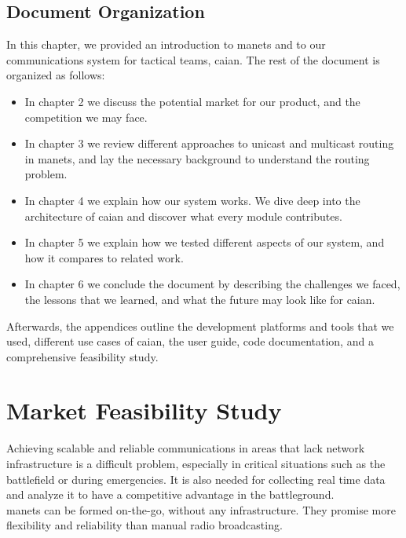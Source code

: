 \section{Document Organization}
In this chapter, we provided an introduction to \acrshort{manets} and to our communications system for tactical teams, \acrshort{caian}. The rest of the document is organized as follows:
\begin{itemize}[itemsep=1pt, topsep=5pt]
    \item In chapter 2 we discuss the potential market for our product, and the competition we may face.
    \item In chapter 3 we review different approaches to unicast and multicast routing in \acrshort{manets}, and lay the necessary background to understand the routing problem. 
    \item In chapter 4 we explain how our system works. We dive deep into the architecture of \acrshort{caian} and discover what every module contributes.
    \item In chapter 5 we explain how we tested different aspects of our system, and how it compares to related work.
    \item In chapter 6 we conclude the document by describing the challenges we faced, the lessons that we learned, and what the future may look like for \acrshort{caian}.
\end{itemize}

Afterwards, the appendices outline the development platforms and tools that we used, different use cases of \acrshort{caian}, the user guide, code documentation, and a comprehensive feasibility study.

\chapter{Market Feasibility Study}
\label{ch:feasability}
Achieving scalable and reliable communications in areas that lack network infrastructure is a difficult problem, especially in critical situations such as the battlefield or during emergencies. It is also needed for collecting real time data and analyze it to have a competitive advantage in the battleground.
\\
\acrfull{manets} can be formed on-the-go, without any infrastructure. They promise more flexibility and reliability than manual radio broadcasting.
\\

